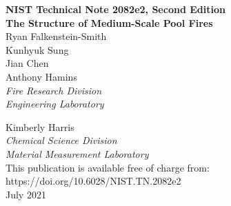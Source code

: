 \documentclass[12pt]{article}
\newcommand{\pubnumber}{2082e2, Second Edition}
\newcommand{\DOI}{https://doi.org/10.6028/NIST.TN.2082e2}
\newcommand{\monthyear}{July 2021}
\begin{document}
\begin{titlepage}
\begin{flushright}
\LARGE{\textbf{NIST Technical Note \pubnumber}}\\
\vfill
\Huge{\textbf{The Structure of Medium-Scale Pool Fires}}\\
\vfill
\normalsize Ryan Falkenstein-Smith\\
Kunhyuk Sung\\
Jian Chen\\
Anthony Hamins\\
\large
\textit{Fire Research Division}\\
\textit{Engineering Laboratory}\\
\vspace{12pt}
\vfill

\normalsize Kimberly Harris\\
\large
\textit{Chemical Science Division}\\
\textit{Material Measurement Laboratory}\\
\vspace{12pt}
\vfill
\normalsize This publication is available free of charge from:\\
\DOI\\
\vfill
\normalsize \monthyear
\vfill


\end{flushright}
\end{titlepage}
\end{document}
